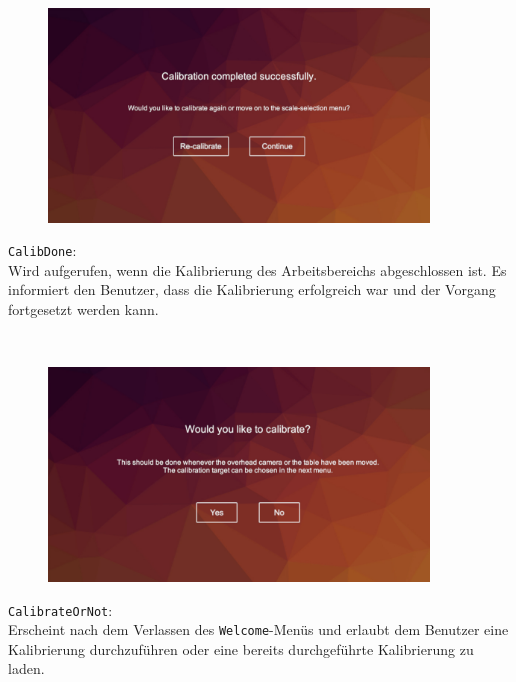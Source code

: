 \begin{minipage}{0.6\textwidth}
	\begin{figure}[H] 
		\includegraphics[trim=3cm 2cm 3cm 2cm, clip, width=0.9\textwidth]{Bilder/CalibDone.jpg}
			\label{fig:CalibDone}
	\end{figure}
\end{minipage}
\begin{minipage}{0.4\textwidth}
	\texttt{CalibDone}:\\
	Wird aufgerufen, wenn die Kalibrierung des Arbeitsbereichs abgeschlossen ist. Es informiert den Benutzer, dass die Kalibrierung erfolgreich war und der Vorgang fortgesetzt werden kann.
\end{minipage}\\

\begin{minipage}{0.6\textwidth}
	\begin{figure}[H] 
		\includegraphics[trim=3cm 2cm 2cm 2cm, clip, width=0.9\textwidth]{Bilder/CalibrateOrNot.jpg}
			\label{fig:CalibrateOrNot}
	\end{figure}
\end{minipage}
\begin{minipage}{0.4\textwidth}
	\texttt{CalibrateOrNot}:\\
	Erscheint nach dem Verlassen des \texttt{Welcome}-Menüs und erlaubt dem Benutzer eine Kalibrierung durchzuführen oder eine bereits durchgeführte Kalibrierung zu laden.
\end{minipage}\\

